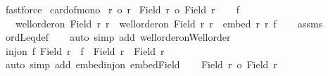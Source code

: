 \begin{isabellebody}
\ fastforce%
\endisatagproof
{\isafoldproof}%
%
\isadelimproof
\isanewline
%
\endisadelimproof
\isanewline
{}\isamarkupfalse%
\ card{\isacharunderscore}{\kern0pt}of{\isacharunderscore}{\kern0pt}mono{}{\isacharcolon}{\kern0pt}\isanewline
{}\ {\isachardoublequoteopen}r\ {\isasymle}o\ r{\isacharprime}{\kern0pt}{\isachardoublequoteclose}\isanewline
{}\ {\isachardoublequoteopen}{\isacharbar}{\kern0pt}Field\ r{\isacharbar}{\kern0pt}\ {\isasymle}o\ {\isacharbar}{\kern0pt}Field\ r{\isacharprime}{\kern0pt}{\isacharbar}{\kern0pt}{\isachardoublequoteclose}\isanewline
%
\isadelimproof
%
\endisadelimproof
%
\isatagproof
{}\isamarkupfalse%
{\isacharminus}{\kern0pt}\isanewline
\ \ \isamarkupfalse%
\ f\ \isanewline
\ \ {}{\isacharcolon}{\kern0pt}\ {\isachardoublequoteopen}well{\isacharunderscore}{\kern0pt}order{\isacharunderscore}{\kern0pt}on\ {\isacharparenleft}{\kern0pt}Field\ r{\isacharparenright}{\kern0pt}\ r\ {\isasymand}\ well{\isacharunderscore}{\kern0pt}order{\isacharunderscore}{\kern0pt}on\ {\isacharparenleft}{\kern0pt}Field\ r{\isacharparenright}{\kern0pt}\ r\ {\isasymand}\ embed\ r\ r{\isacharprime}{\kern0pt}\ f{\isachardoublequoteclose}\isanewline
\ \ \isamarkupfalse%
\ assms\ \isamarkupfalse%
\ ordLeq{\isacharunderscore}{\kern0pt}def\isanewline
\ \ \isamarkupfalse%
\ {\isacharparenleft}{\kern0pt}auto\ simp\ add{\isacharcolon}{\kern0pt}\ well{\isacharunderscore}{\kern0pt}order{\isacharunderscore}{\kern0pt}on{\isacharunderscore}{\kern0pt}Well{\isacharunderscore}{\kern0pt}order{\isacharparenright}{\kern0pt}\isanewline
\ \ \isamarkupfalse%
\ {\isachardoublequoteopen}inj{\isacharunderscore}{\kern0pt}on\ f\ {\isacharparenleft}{\kern0pt}Field\ r{\isacharparenright}{\kern0pt}\ {\isasymand}\ f\ {\isacharbackquote}{\kern0pt}\ {\isacharparenleft}{\kern0pt}Field\ r{\isacharparenright}{\kern0pt}\ {\isasymle}\ Field\ r{\isacharprime}{\kern0pt}{\isachardoublequoteclose}\isanewline
\ \ \isamarkupfalse%
\ {\isacharparenleft}{\kern0pt}auto\ simp\ add{\isacharcolon}{\kern0pt}\ embed{\isacharunderscore}{\kern0pt}inj{\isacharunderscore}{\kern0pt}on\ embed{\isacharunderscore}{\kern0pt}Field{\isacharparenright}{\kern0pt}\isanewline
\ \ \isamarkupfalse%
\ {\isachardoublequoteopen}{\isacharbar}{\kern0pt}Field\ r{\isacharbar}{\kern0pt}\ {\isasymle}o\ {\isacharbar}{\kern0pt}Field\ r{\isacharprime}{\kern0pt}{\isacharbar}{\kern0pt}{\isachardoublequoteclose}\ \isamarkupfalse%

\end{isabellebody}
